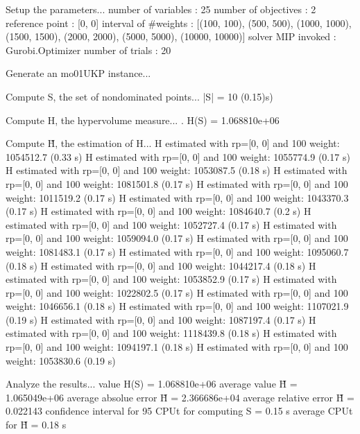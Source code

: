 Setup the parameters...
  number of variables  : 25
  number of objectives : 2
  reference point      : [0, 0]
  interval of #weights : [(100, 100), (500, 500), (1000, 1000), (1500, 1500), (2000, 2000), (5000, 5000), (10000, 10000)]
  solver MIP invoked   : Gurobi.Optimizer
  number of trials     : 20

Generate an mo01UKP instance...

Compute S, the set of nondominated points...
  |S|  = 10 (0.15)s)

Compute H, the hypervolume measure...
. H(S) = 1.068810e+06

Compute H̃, the estimation of H...
  H estimated with rp=[0, 0] and 100 weight:  1054512.7  (0.33 s)
  H estimated with rp=[0, 0] and 100 weight:  1055774.9  (0.17 s)
  H estimated with rp=[0, 0] and 100 weight:  1053087.5  (0.18 s)
  H estimated with rp=[0, 0] and 100 weight:  1081501.8  (0.17 s)
  H estimated with rp=[0, 0] and 100 weight:  1011519.2  (0.17 s)
  H estimated with rp=[0, 0] and 100 weight:  1043370.3  (0.17 s)
  H estimated with rp=[0, 0] and 100 weight:  1084640.7  (0.2 s)
  H estimated with rp=[0, 0] and 100 weight:  1052727.4  (0.17 s)
  H estimated with rp=[0, 0] and 100 weight:  1059094.0  (0.17 s)
  H estimated with rp=[0, 0] and 100 weight:  1081483.1  (0.17 s)
  H estimated with rp=[0, 0] and 100 weight:  1095060.7  (0.18 s)
  H estimated with rp=[0, 0] and 100 weight:  1044217.4  (0.18 s)
  H estimated with rp=[0, 0] and 100 weight:  1053852.9  (0.17 s)
  H estimated with rp=[0, 0] and 100 weight:  1022802.5  (0.17 s)
  H estimated with rp=[0, 0] and 100 weight:  1046656.1  (0.18 s)
  H estimated with rp=[0, 0] and 100 weight:  1107021.9  (0.19 s)
  H estimated with rp=[0, 0] and 100 weight:  1087197.4  (0.17 s)
  H estimated with rp=[0, 0] and 100 weight:  1118439.8  (0.18 s)
  H estimated with rp=[0, 0] and 100 weight:  1094197.1  (0.18 s)
  H estimated with rp=[0, 0] and 100 weight:  1053830.6  (0.19 s)

Analyze the results...
  value H(S)                  = 1.068810e+06 
  average value H̃             = 1.065049e+06 
  average absolue error H̃     = 2.366686e+04 
  average relative error H̃    = 0.022143 
  confidence interval for 95%
  CPUt for computing S         = 0.15 s
  average CPUt for H̃           = 0.18 s

